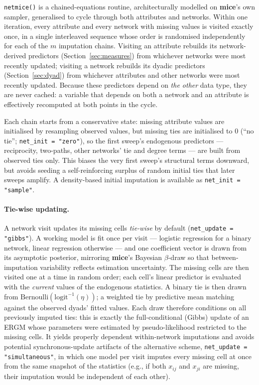 \documentclass[11pt,a4paper]{article}
\newcommand{\pkg}[1]{\textbf{#1}}
\newcommand{\code}[1]{\texttt{#1}}
\begin{document}
\code{netmice()} is a chained-equations routine, architecturally modelled on
\pkg{mice}'s own sampler, generalised to cycle through both attributes and
networks. Within one iteration, every attribute and every network with
missing values is visited exactly once, in a single interleaved sequence
whose order is randomised independently for each of the $m$ imputation
chains. Visiting an attribute rebuilds its network-derived predictors
(Section~\ref{sec:measures}) from whichever networks were most recently
updated; visiting a network rebuilds its dyadic predictors
(Section~\ref{sec:dyad}) from whichever attributes and other networks were
most recently updated. Because these predictors depend on \emph{the other}
data type, they are never cached: a variable that depends on both a network
and an attribute is effectively recomputed at both points in the cycle.

Each chain starts from a conservative state: missing attribute
values are initialised by resampling observed values, but missing ties are
initialised to $0$ (``no tie''; \code{net\_init = "zero"}), so the first
sweep's endogenous predictors --- reciprocity, two-paths, other networks'
tie and degree terms --- are built from observed ties only. This biases the
very first sweep's structural terms downward, but avoids seeding a
self-reinforcing surplus of random initial ties that later sweeps amplify. A density-based initial imputation is available as \code{net\_init = "sample"}.

\paragraph{Tie-wise updating.} A network visit updates its missing cells
\emph{tie-wise} by default (\code{net\_update = "gibbs"}). A working model
is fit once per visit --- logistic regression for a
binary network, linear regression otherwise --- and one coefficient vector
is drawn from its asymptotic posterior, mirroring \pkg{mice}'s Bayesian
$\beta$-draw so that between-imputation variability reflects estimation
uncertainty. The missing cells are then visited one at a time in random
order; each cell's linear predictor is evaluated with the \emph{current}
values of the endogenous statistics. A binary tie is then drawn from
$\mathrm{Bernoulli}(\mathrm{logit}^{-1}(\eta))$; a weighted tie by
predictive mean matching against the observed dyads' fitted values. Each
draw therefore conditions on all previously imputed ties: this is exactly
the full-conditional (Gibbs) update of an ERGM whose parameters were
estimated by pseudo-likelihood restricted to the missing cells. It yields properly dependent within-network
imputations and avoids potential synchronous-update artifacts of the alternative
scheme, \code{net\_update = "simultaneous"}, in which one model
per visit imputes every missing cell at once from the same snapshot
of the statistics (e.g., if both $x_{ij}$ and $x_{ji}$ are missing, their imputation would be independent of each other).
\end{document}
